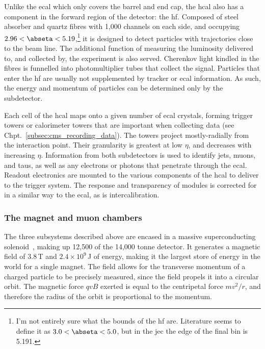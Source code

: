 Unlike the \acrshort{ecal} which only covers the barrel and end cap, the \acrshort{hcal} also has a component in the forward region of the detector: the \acrfull{hf}. Composed of steel absorber and quartz fibres with 1,000 channels on each side, and occupying $\text{2.96} < \abseta < \text{5.19}$,\footnote{I'm not entirely sure what the bounds of the \acrshort{hf} are. Literature seems to define it as $3.0 < \abseta < 5.0$, but in the \acrshort{jec} the edge of the final \abseta bin is 5.191.} it is designed to detect particles with trajectories close to the beam line. The additional function of measuring the luminosity delivered to, and collected by, the experiment is also served. Cherenkov light kindled in the fibres is funnelled into photomultiplier tubes that collect the signal. Particles that enter the \acrshort{hf} are usually not supplemented by tracker or \acrshort{ecal} information. As such, the energy and momentum of particles can be determined only by the subdetector.

Each cell of the \acrshort{hcal} maps onto a given number of \acrshort{ecal} crystals, forming trigger towers or calorimeter towers that are important when collecting data (see Chpt.~\ref{subsec:cms_recording_data}). The towers project mostly-radially from the interaction point. Their granularity is greatest at low $\eta$, and decreases with increasing $\eta$. Information from both subdetectors is used to identify \glspl{jet}, muons, and taus, as well as any electrons or photons that penetrate through the \acrshort{ecal}. Readout electronics are mounted to the various components of the \acrshort{hcal} to deliver to the trigger system. The response and transparency of modules is corrected for in a similar way to the \acrshort{ecal}, as is intercalibration.




\subsubsection{The magnet and muon chambers}
\label{subsubsec:cms_magnet_muons}

The three subsystems described above are encased in a massive superconducting solenoid~\cite{CERN-LHCC-97-010}, making up 12,500 of the 14,000 tonne detector. It generates a magnetic field of 3.8\,T and $\text{2.4} \times \text{10}^9$\,J of energy, making it the largest store of energy in the world for a single magnet. The field allows for the transverse momentum of a charged particle to be precisely measured, since the field propels it into a circular orbit. The magnetic force $qvB$ exerted is equal to the centripetal force $mv^2/r$, and therefore the radius of the orbit is proportional to the momentum.

